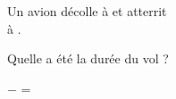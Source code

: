 \begin{exercice}
    Un avion décolle à  et atterrit \\ à .
    
    Quelle a été la durée du vol ?
\end{exercice}
\begin{corrige}
     $-$  = 
\end{corrige}